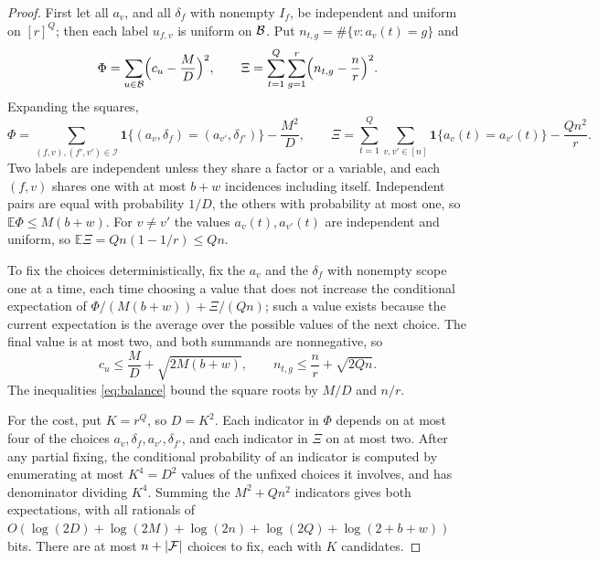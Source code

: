 \begin{proof}
First let all $a_v$, and all $\delta_f$ with nonempty $I_f$, be independent and
uniform on $[r]^{Q}$; then each label $u_{f,v}$ is uniform on $\mathcal{B}$. Put
$n_{t,g}=\#\{v:a_v(t)=g\}$ and
\[
  \Phi=\sum_{u\in\mathcal{B}}\Bigl(c_u-\frac MD\Bigr)^2,\qquad
  \Xi=\sum_{t=1}^{Q}\sum_{g=1}^{r}\Bigl(n_{t,g}-\frac nr\Bigr)^2 .
\]
Expanding the squares,
\[
  \Phi=\sum_{(f,v),(f',v')\in\mathcal I}\mathbf 1\{(a_v,\delta_f)=(a_{v'},\delta_{f'})\}-\frac{M^2}D,\qquad
  \Xi=\sum_{t=1}^{Q}\sum_{v,v'\in[n]}\mathbf 1\{a_v(t)=a_{v'}(t)\}-\frac{Qn^2}r .
\]
Two labels are independent unless they share a factor or a variable, and each
$(f,v)$ shares one with at most $b+w$ incidences including itself. Independent
pairs are equal with probability $1/D$, the others with probability at most one,
so $\mathbb E\Phi\le M(b+w)$. For $v\ne v'$ the values $a_v(t),a_{v'}(t)$ are
independent and uniform, so $\mathbb E\Xi=Qn(1-1/r)\le Qn$.

To fix the choices deterministically, fix the $a_v$ and the $\delta_f$ with
nonempty scope one at a time, each time choosing a value that does not increase
the conditional expectation of $\Phi/(M(b+w))+\Xi/(Qn)$; such a value exists
because the current expectation is the average over the possible values of the
next choice. The final value is at most two, and both summands are nonnegative, so
\[
  c_u\le\frac MD+\sqrt{2M(b+w)},\qquad n_{t,g}\le\frac nr+\sqrt{2Qn}.
\]
The inequalities \eqref{eq:balance} bound the square roots by $M/D$ and $n/r$.

For the cost, put $K=r^{Q}$, so $D=K^2$. Each indicator in $\Phi$ depends on at
most four of the choices $a_v,\delta_f,a_{v'},\delta_{f'}$, and each indicator in
$\Xi$ on at most two. After any partial fixing, the conditional probability of an
indicator is computed by enumerating at most $K^4=D^2$ values of the unfixed
choices it involves, and has denominator dividing $K^4$. Summing the $M^2+Qn^2$
indicators gives both expectations, with all rationals of
$O(\log(2D)+\log(2M)+\log(2n)+\log(2Q)+\log(2+b+w))$ bits. There are at most
$n+|\mathcal{F}|$ choices to fix, each with $K$ candidates.
\end{proof}

